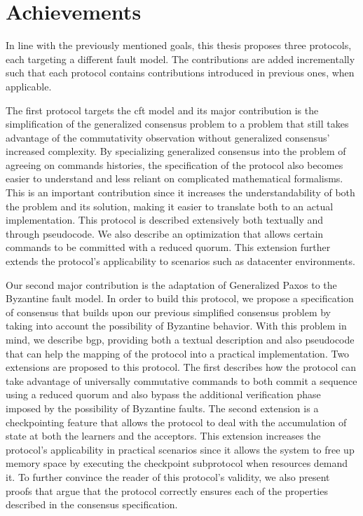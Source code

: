\section{Achievements}
In line with the previously mentioned goals, this thesis proposes three protocols, each targeting a different fault model. The contributions are added incrementally such that each protocol contains contributions introduced in previous ones, when applicable. \par
The first protocol targets the \acrshort{cft} model and its major contribution is the simplification of the generalized consensus problem to a problem that still takes advantage of the commutativity observation without generalized consensus' increased complexity. By specializing generalized consensus into the problem of agreeing on commands histories, the specification of the protocol also becomes easier to understand and less reliant on complicated mathematical formalisms. This is an important contribution since it increases the understandability of both the problem and its solution, making it easier to translate both to an actual implementation. This protocol is described extensively both textually and through pseudocode. We also describe an optimization that allows certain commands to be committed with a reduced quorum. This extension further extends the protocol's applicability to scenarios such as datacenter environments.\par
Our second major contribution is the adaptation of Generalized Paxos to the Byzantine fault model. In order to build this protocol, we propose a specification of consensus that builds upon our previous simplified consensus problem by taking into account the possibility of Byzantine behavior. With this problem in mind, we describe \acrlong{bgp}, providing both a textual description and also pseudocode that can help the mapping of the protocol into a practical implementation. Two extensions are proposed to this protocol. The first describes how the protocol can take advantage of universally commutative commands to both commit a sequence using a reduced quorum and also bypass the additional verification phase imposed by the possibility of Byzantine faults. The second extension is a checkpointing feature that allows the protocol to deal with the accumulation of state at both the learners and the acceptors. This extension increases the protocol's applicability in practical scenarios since it allows the system to free up memory space by executing the checkpoint subprotocol when resources demand it. To further convince the reader of this protocol's validity, we also present proofs that argue that the protocol correctly ensures each of the properties described in the consensus specification.\par
